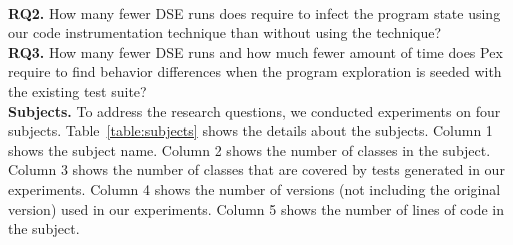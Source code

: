 		\\ \textbf{RQ2.} How many fewer DSE runs does  require to infect the program state using our code instrumentation technique than without using the technique?
	\\ \textbf{RQ3.} How many fewer DSE runs and how much fewer amount of time does Pex require to find behavior differences when the program exploration is seeded with the existing test suite?
%	
%
%	
%												
%
\\  \textbf{Subjects.} To address the research questions, we conducted experiments on four subjects.
Table~\ref{table:subjects} shows the details about the subjects. Column 1 shows the subject name. Column 2 shows the number of classes in the subject. Column 3 shows the number of classes that are covered by tests generated in our experiments. Column 4 shows the number of versions (not including the original version) used in our experiments. Column 5 shows the number of lines of code in the subject.

